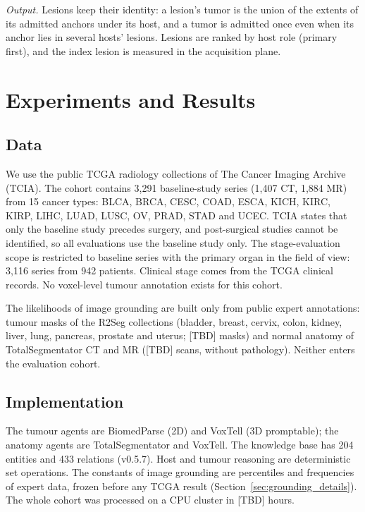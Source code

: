 \documentclass[fleqn,10pt]{olplainarticle}
\begin{document}
\emph{Output.} Lesions keep their identity: a lesion's tumor is the union of the extents of its admitted anchors under its
host, and a tumor is admitted once even when its anchor lies in several hosts' lesions. Lesions are ranked by host role
(primary first), and the index lesion is measured in the acquisition plane.

\section{Experiments and Results}
\label{sec:results}

\subsection{Data}
We use the public TCGA radiology collections of The Cancer Imaging Archive (TCIA). The cohort contains 3{,}291
baseline-study series (1{,}407 CT, 1{,}884 MR) from 15 cancer types: BLCA, BRCA, CESC, COAD, ESCA, KICH, KIRC, KIRP,
LIHC, LUAD, LUSC, OV, PRAD, STAD and UCEC. TCIA states that only the baseline study precedes surgery, and post-surgical
studies cannot be identified, so all evaluations use the baseline study only. The stage-evaluation scope is restricted
to baseline series with the primary organ in the field of view: 3{,}116 series from 942 patients. Clinical stage comes
from the TCGA clinical records. No voxel-level tumour annotation exists for this cohort.

The likelihoods of image grounding are built only from public expert annotations: tumour masks of the R2Seg collections
(bladder, breast, cervix, colon, kidney, liver, lung, pancreas, prostate and uterus; [TBD] masks) and normal anatomy of
TotalSegmentator CT and MR ([TBD] scans, without pathology). Neither enters the evaluation cohort.

\subsection{Implementation}
The tumour agents are BiomedParse (2D) and VoxTell (3D promptable); the anatomy agents are TotalSegmentator and VoxTell. The
knowledge base has 204 entities and 433 relations (v0.5.7). Host and tumour reasoning are deterministic set operations.
The constants of image grounding are percentiles and frequencies of expert data, frozen before any TCGA result
(Section~\ref{sec:grounding_details}). The whole cohort was processed on a CPU cluster in [TBD] hours.
\end{document}
